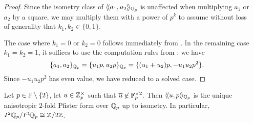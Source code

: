 \documentclass[12pt, leqno, british]{amsart}
\begin{document}
\begin{proof}
Since the isometry class of $\langle\!\langle a_1, a_2 \rangle\!\rangle_{\mathbb Q_p}$ is unaffected when multiplying $a_1$ or $a_2$ by a square, we may multiply them with a power of $p^k$ to assume without loss of generality that $k_1, k_2 \in \lbrace 0, 1 \rbrace$.

The case where $k_1 = 0$ or $k_2 = 0$ follows immediately from .
In the remaining case $k_1 = k_2 = 1$, it suffices to use the computation rules from : we have
$$ \lbrace a_1, a_2 \rbrace_{\mathbb Q_p} = \lbrace u_1p, u_2p \rbrace_{\mathbb Q_p} = \lbrace (u_1+u_2)p, -u_1u_2p^2\rbrace.$$
Since $-u_1u_2p^2$ has even value, we have reduced to a solved case.
\end{proof}
\begin{cor}\label{C:unique-2-fold-Pfister-qqp-odd}
Let $p \in \mathbb P \setminus \lbrace 2 \rbrace$, let $u \in \mathbb Z_p^\times$ such that $\overline{u} \not\in \mathbb F_p^{\times 2}$.
Then $\langle\!\langle u, p \rangle\!\rangle_{\mathbb Q_p}$ is the unique anisotropic $2$-fold Pfister form over $\mathbb Q_p$ up to isometry.
In particular, $I^2\mathbb Q_p/I^3\mathbb Q_p \cong \mathbb Z/2\mathbb Z$.
\end{cor}
\end{document}

